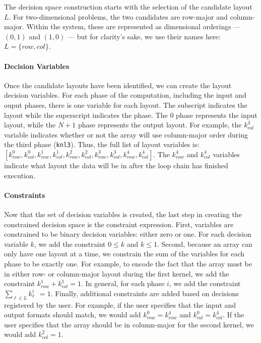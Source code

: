 The decision space construction starts with the selection of the candidate layout $L$.
For two-dimensional problems, the two candidates are row-major and column-major.
Within the system, these are represented as dimensional orderings --- $(0,1)$ and $(1,0)$ --- but for clarity's sake, we use their names here: $L=\{row,col\}$.

\paragraph{Decision Variables}
Once the candidate layouts have been identified, we can create the layout decision variables.
For each phase of the computation, including the input and ouput phases, there is one variable for each layout.
The subscript indicates the layout while the superscript indicates the phase. 
The 0 phase represents the input layout, while the $N+1$ phase represents the output layout.
For example, the $k_{col}^{3}$ variable indicates whether or not the array will use column-major order during the third phase (\verb.knl3.).
Thus, the full list of layout variables is: $[k_{row}^{0}, k_{col}^{0}, k_{row}^{1}, k_{col}^{1},k_{row}^{2}, k_{col}^{2},k_{row}^{3}, k_{col}^{3},k_{row}^{4}, k_{col}^{4}]$.
The $k_{row}^4$ and $k_{col}^4$ variables indicate what layout the data will be in after the loop chain has finished execution.

\paragraph{Constraints}
Now that the set of decision variables is created, the last step in creating the constrained decision space is the constraint expression. 
First, variables are constrained to be binary decision variables: either zero or one. 
For each decision variable $k$, we add the constraint $0 \leq k$ and $k \leq 1$.
Second, because an array can only have one layout at a time, we constrain the sum of the variables for each phase to be exactly one.
For example, to encode the fact that the array must be in either row- or column-major layout during the first kernel, we add the constraint $k_{row}^1 + k_{col}^1 = 1$.
In general, for each phase $i$, we add the constraint $\sum_{\ell \in L} k_\ell^{i} \ \ = 1$.
Finally, additional constraints are added based on decisions registered by the user.
For example, if the user specifies that the input and output formats should match, we would add $k_{row}^0 = k_{row}^4$ and  $k_{col}^0 = k_{col}^4$.
If the user specifies that the array should be in column-major for the second kernel, we would add $k_{col}^2 = 1$.

